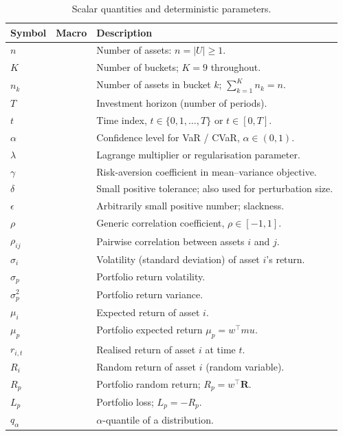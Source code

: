 \documentclass[12pt,openany]{book}
\newcommand{\bfw}{\mathbf{w}}
\newcommand{\bfmu}{\boldsymbol{\mu}}
\newcommand{\calU}{\mathcal{U}}
\numberwithin{equation}{chapter}
\theoremstyle{plain}
\theoremstyle{definition}
\theoremstyle{remark}
\renewcommand{\arraystretch}{1.2}
\def\calU{U}%
\def\mathcal#1{#1}%
\def\bfw{w}%
\def\bfmu{mu}%
\begin{document}
\begin{table}[H]
\renewcommand{\arraystretch}{1.35}
\caption{Scalar quantities and deterministic parameters.}
\label{tab:symbols-scalars}
\begin{tabularx}{\linewidth}{@{} l l X @{}}
\toprule
\textbf{Symbol} & \textbf{Macro} & \textbf{Description} \\
\midrule
$n$ & & Number of assets: $n=|\calU|\geq1$. \\
$K$ & & Number of buckets; $K=9$ throughout. \\
$n_k$ & & Number of assets in bucket $k$; $\sum_{k=1}^K n_k = n$. \\
$T$ & & Investment horizon (number of periods). \\
$t$ & & Time index, $t\in\{0,1,\ldots,T\}$ or $t\in[0,T]$. \\
$\alpha$ & & Confidence level for VaR / CVaR, $\alpha\in(0,1)$. \\
$\lambda$ & & Lagrange multiplier or regularisation parameter. \\
$\gamma$ & & Risk-aversion coefficient in mean--variance objective. \\
$\delta$ & & Small positive tolerance; also used for perturbation size. \\
$\epsilon$ & & Arbitrarily small positive number; slackness. \\
$\rho$ & & Generic correlation coefficient, $\rho\in[-1,1]$. \\
$\rho_{ij}$ & & Pairwise correlation between assets $i$ and $j$. \\
$\sigma_i$ & & Volatility (standard deviation) of asset $i$'s return. \\
$\sigma_p$ & & Portfolio return volatility. \\
$\sigma_p^2$ & & Portfolio return variance. \\
$\mu_i$ & & Expected return of asset $i$. \\
$\mu_p$ & & Portfolio expected return $\mu_p = \bfw^\top\bfmu$. \\
$r_{i,t}$ & & Realised return of asset $i$ at time $t$. \\
$R_i$ & & Random return of asset $i$ (random variable). \\
$R_p$ & & Portfolio random return; $R_p = \bfw^\top\mathbf{R}$. \\
$L_p$ & & Portfolio loss; $L_p = -R_p$. \\
$q_\alpha$ & & $\alpha$-quantile of a distribution. \\
\bottomrule
\end{tabularx}
\end{table}
\end{document}
